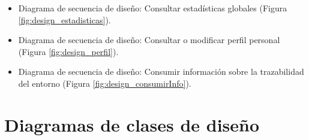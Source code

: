 \documentclass[12pt,a4paper, twoside]{report}
\begin{document}
\begin{itemize}
		\newpage
		
		\item Diagrama de secuencia de diseño: Consultar estadísticas globales (Figura \ref{fig:design_estadisticas}).
		
		
		\newpage
		
		\item Diagrama de secuencia de diseño: Consultar o modificar perfil personal (Figura \ref{fig:design_perfil}).
		
		
		\newpage
		
		\item Diagrama de secuencia de diseño: Consumir información sobre la trazabilidad del entorno (Figura \ref{fig:design_consumirInfo}).
		
		
	\end{itemize}
	
	\newpage
	
	\section{Diagramas de clases de diseño} \label{classes}
		
\end{document}

